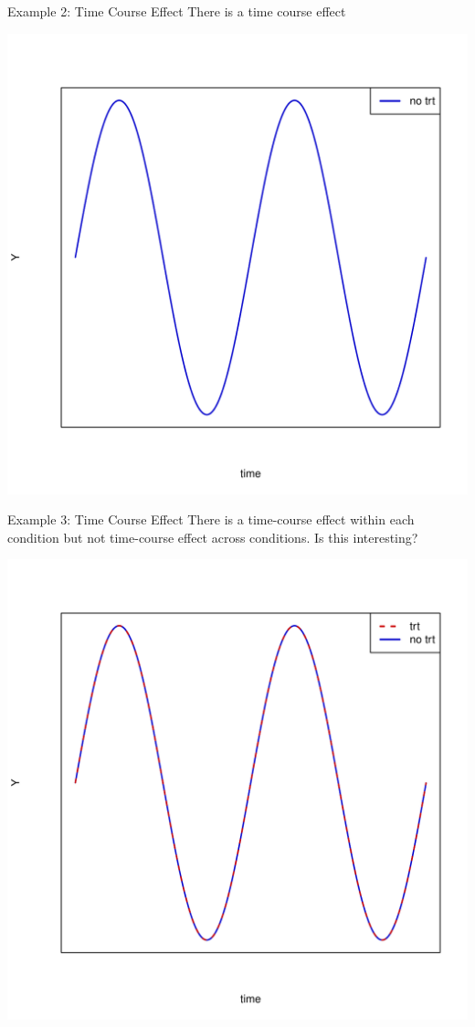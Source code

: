 \documentclass[xcolor=x11names,compress]{beamer}\usepackage[]{graphicx}\usepackage[]{color}
\newenvironment{knitrout}{}{} %
\begin{document}
\begin{frame}{Example 2: Time Course Effect}
  There is a time course effect
\begin{knitrout}\tiny
{}\color{fgcolor}

{\centering \includegraphics[width=.6\linewidth]{figure/beamer-unnamed-chunk-96-1} 

}



\end{knitrout}
\end{frame}

\begin{frame}{Example 3: Time Course Effect}
  There is a time-course effect within each condition but not time-course effect
  across conditions. Is this interesting? 
\begin{knitrout}\tiny
{}\color{fgcolor}

{\centering \includegraphics[width=.6\linewidth]{figure/beamer-unnamed-chunk-97-1} 

}



\end{knitrout}
\end{frame}
\end{document}
